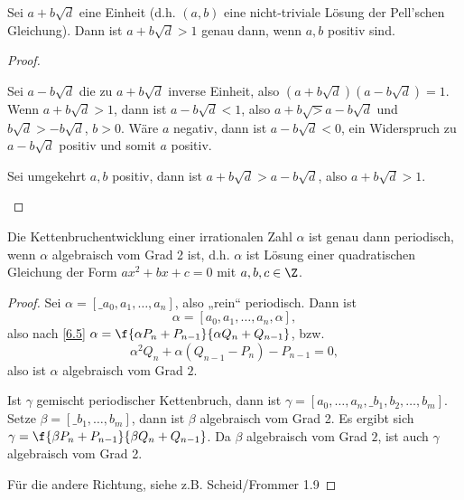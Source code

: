 \setcounter{thm}{8}
\begin{lem} \label{6.9}
	Sei $a + b \sqrt d$ eine Einheit (d.h. $(a,b)$ eine nicht-triviale Lösung der Pell'schen Gleichung).
	Dann ist $a + b \sqrt d > 1$ genau dann, wenn $a, b$ positiv sind.
	\begin{proof}
		\begin{segnb}{\ProofImplication}
			Sei $a - b \sqrt d$ die zu $a + b \sqrt d$ inverse Einheit, also $(a + b \sqrt d)(a - b \sqrt d) = 1$.
			Wenn $a + b \sqrt d > 1$, dann ist $a - b \sqrt d < 1$, also $a + b \sqrt > a - b \sqrt d$ und $b \sqrt d > - b \sqrt d$, $b > 0$.
			Wäre $a$ negativ, dann ist $a - b \sqrt d < 0$, ein Widerspruch zu $a - b \sqrt d$ positiv und somit $a$ positiv.
		\end{segnb}
		\begin{segnb}{\ProofImplication*}
			Sei umgekehrt $a, b$ positiv, dann ist $a + b \sqrt d > a - b \sqrt d$, also $a + b \sqrt d > 1$.
		\end{segnb}
	\end{proof}
\end{lem}

\begin{st} \label{6.10}
	Die Kettenbruchentwicklung einer irrationalen Zahl $\alpha$ ist genau dann periodisch, wenn $\alpha$ algebraisch vom Grad 2 ist, d.h. $\alpha$ ist Lösung einer quadratischen Gleichung der Form $ax^2 + bx + c = 0$ mit $a, b, c \in \Z$.
	\begin{proof}
		Sei $\alpha = [\_{a_0, a_1, \dotsc, a_n}]$, also „rein“ periodisch.
		Dann ist
		\[
			\alpha = [a_0, a_1, \dotsc, a_n, \alpha],
		\]
		also nach \ref{6.5} $\alpha = \f{\alpha P_n + P_{n-1}}{\alpha Q_n + Q_{n-1}}$, bzw.
		\[
			\alpha^2 Q_n + \alpha (Q_{n-1} - P_n) - P_{n-1} = 0,
		\]
		also ist $\alpha$ algebraisch vom Grad $2$.

		Ist $\gamma$ gemischt periodischer Kettenbruch, dann ist $\gamma = [a_0, \dotsc, a_n, \_{b_1, b_2, \dotsc, b_m}]$.
		Setze $\beta = [\_{b_1, \dotsc, b_m}]$, dann ist $\beta$ algebraisch vom Grad 2.
		Es ergibt sich $\gamma = \f{\beta P_n + P_{n-1}}{\beta Q_n + Q_{n-1}}$.
		Da $\beta$ algebraisch vom Grad $2$, ist auch $\gamma$ algebraisch vom Grad 2.

		Für die andere Richtung, siehe z.B. Scheid/Frommer 1.9 %
	\end{proof}
\end{st}
